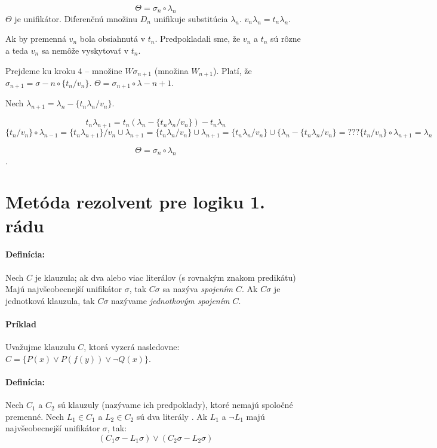 $$\Theta = \sigma_n \circ \lambda_n$$ 
$\Theta$ je unifikátor. Diferenčnú množinu $D_n$ unifikuje substitúcia
$\lambda_n$. $v_n \lambda_n = t_n \lambda_n$.

\par Ak by premenná $v_n$ bola obsiahnutá v $t_n$. Predpokladali sme, že $v_n$ a
$t_n$ sú rôzne a teda $v_n$ sa nemôže vyskytovať v $t_n$.

\par Prejdeme ku kroku 4 -- množine $W\sigma_{n+1}$ (množina $W_{n+1}$). Platí,
že $\sigma_{n+1} = \sigma-n \circ \{ t_n/v_n \}$. $\Theta = \sigma_{n+1} \circ
\lambda-{n+1}$.

\par Nech $\lambda_{n+1} = \lambda_n - \{t_n\lambda_n/v_n\}$. 

$$t_n\lambda_{n+1} = t_n (\lambda_n - \{t_n\lambda_n / v_n\}) -  t_n\lambda_n$$
$$\{ t_n / v_n\} \circ \lambda_{n-1} = \{t_n \lambda_{n+1}\}/v_n \cup
\lambda_{n+1} = \{t_n\lambda_n /v_n\} \cup \lambda_{n+1} = \{t_n\lambda_n/v_n\}
\cup \{ \lambda_n - \{ t_n\lambda_n/v_n\} = ??? \{ t_n/v_n \} \circ
\lambda_{n+1} = \lambda_n$$

$$\Theta = \sigma_n \circ \lambda_n$$.

\section {Metóda rezolvent pre logiku 1. rádu}

\paragraph{Definícia:} Nech $C$ je klauzula; ak dva alebo viac literálov (s
rovnakým znakom predikátu) Majú najvšeobecnejší unifikátor $\sigma$, tak
$C\sigma$ sa nazýva \emph{spojením $C$}. Ak $C\sigma$ je jednotková klauzula,
tak $C\sigma$ nazývame \emph{jednotkovým spojením $C$}.


\paragraph{Príklad} Uvažujme klauzulu $C$, ktorá vyzerá nasledovne: $C = \{ P(x)
\lor P(f(y)) \lor \neg Q(x)\}$. 

\paragraph{Definícia:} Nech $C_1$ a $C_2$ sú klauzuly (nazývame ich
predpoklady), ktoré nemajú spoločné premenné. Nech $L_1 \in C_1$ a $L_2 \in
C_2$ sú dva literály . Ak $L_1$ a $\neg L_1$ majú najvšeobecnejší unifikátor
$\sigma$, tak:
$$(C_1\sigma - L_1\sigma) \lor (C_2\sigma - L_2\sigma)$$

